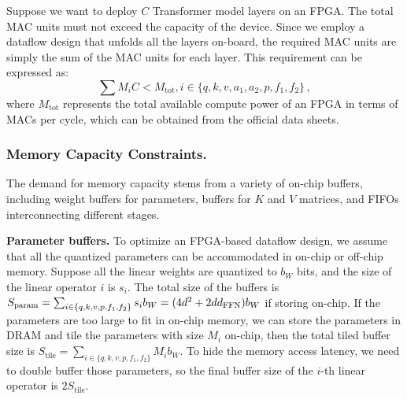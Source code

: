 Suppose we want to deploy $C$ Transformer model layers on an FPGA. 
The total MAC units must not exceed the capacity of the device.
Since we employ a dataflow design that unfolds all the layers on-board, the required MAC units are simply the sum of the MAC units for each layer.
This requirement can be expressed as:
\begin{equation}
    \label{eq:mac_constraint}
     \sum{M_i}C < M_{\text{tot}}, {i\in\{q,k,v, a_1, a_2, p, f_1, f_2\}}\,,
\end{equation}
where $M_{\text{tot}}$ represents the total available compute power of an FPGA in terms of MACs per cycle,
which can be obtained from the official data sheets.

\subsubsection{Memory Capacity Constraints.}
\label{subsubsec:memory_resource}
The demand for memory capacity stems from a variety of on-chip buffers, including weight buffers for parameters, buffers for $K$ and $V$ matrices, and FIFOs interconnecting different stages.

\textbf{Parameter buffers.}
To optimize an FPGA-based dataflow design, we assume that all the quantized parameters can be accommodated in on-chip or off-chip memory.
Suppose all the linear weights are quantized to $b_W$ bits, and the size of the linear operator $i$ is $s_i$.
The total size of the buffers is $S_{\text{param}}=\sum_{i\in\{q,k,v,p,f_1,f_2\}}s_ib_W=(4d^2+2dd_{\text{FFN}})b_W$ if storing on-chip.
If the parameters are too large to fit in on-chip memory, we can store the parameters in DRAM and tile the parameters with size $M_i$ on-chip, then the total tiled buffer size is $S_{\text{tile}}=\sum_{i\in\{q,k,v,p,f_1,f_2\}}M_ib_W$.
To hide the memory access latency, we need to double buffer those parameters, so the final buffer size of the $i$-th linear operator is $2S_{\text{tile}}$.

